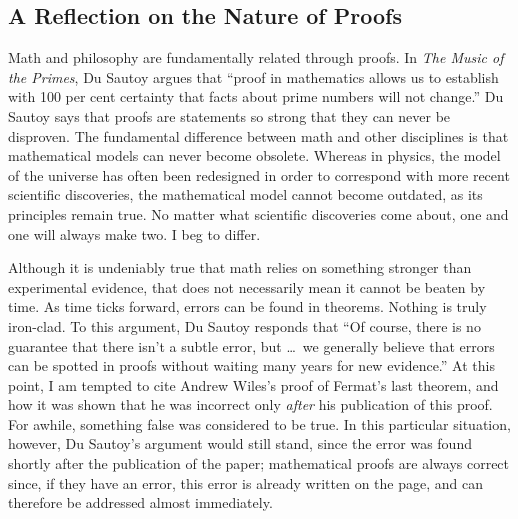 \documentclass{mathbook}
\begin{document}
    \subsection{A Reflection on the Nature of Proofs}\label{proofs}

    Math and philosophy are fundamentally related through proofs. In \emph{The Music of the Primes}, Du Sautoy argues that ``proof in mathematics allows us to establish with 100 per cent certainty that facts about prime numbers will not change.'' \cite[pg.~32]{Sautoy2003} Du Sautoy says that proofs are statements so strong that they can never be disproven. The fundamental difference between math and other disciplines is that mathematical models can never become obsolete. Whereas in physics, the model of the universe has often been redesigned in order to correspond with more recent scientific discoveries, the mathematical model cannot become outdated, as its principles remain true. No matter what scientific discoveries come about, one and one will always make two. I beg to differ. \par
    
    Although it is undeniably true that math relies on something stronger than experimental evidence, that does not necessarily mean it cannot be beaten by time. As time ticks forward, errors can be found in theorems. Nothing is truly iron-clad. To this argument, Du Sautoy responds that ``Of course, there is no guarantee that there isn't a subtle error, but \dots~we generally believe that errors can be spotted in proofs without waiting many years for new evidence.'' \cite[p.~33]{Sautoy2003} At this point, I am tempted to cite Andrew Wiles's proof of Fermat's last theorem, and how it was shown that he was incorrect only \emph{after} his publication of this proof. For awhile, something false was considered to be true. In this particular situation, however, Du Sautoy's argument would still stand, since the error was found shortly after the publication of the paper; mathematical proofs are always correct since, if they have an error, this error is already written on the page, and can therefore be addressed almost immediately. \par
    
\end{document}
